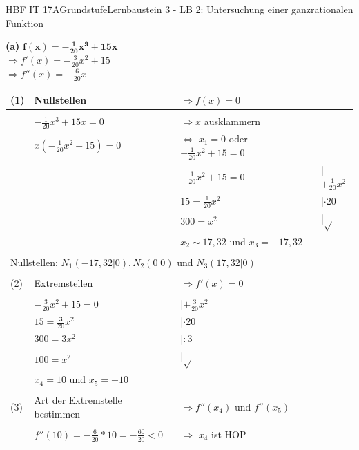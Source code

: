 \documentclass[oneside,openany,headings=optiontotoc,11pt,numbers=noenddot]{scrreprt}
\begin{document}
\begin{worksheet}{HBF IT 17A}{Grundstufe}{Lernbaustein 3 - LB 2: Untersuchung einer ganzrationalen Funktion}
		\newpage
		\begin{framed}
			\noindent
			\textbf{(a)} \(\mathbf{f(x) = -\frac{1}{20}x^3 +15x}\)\\
			\(\Rightarrow f'(x) = -\frac{3}{20}x^2 +15\)\\
			\(\Rightarrow f''(x) = -\frac{6}{20}x\)\\
			\par\bigskip\noindent
			\begin{tabularx}{\textwidth}{lXXl}
				(1) & Nullstellen & \(\Rightarrow f(x) = 0\)\\
				 \hline\\
				 & \(-\frac{1}{20}x^3 +15x = 0\) & \(\Rightarrow x\) ausklammern\\
				 & \( x(-\frac{1}{20}x^2 +15) = 0\) & \(\Leftrightarrow\) \colorbox{green!10}{\(x_1 = 0\)} oder \(-\frac{1}{20}x^2 +15 = 0\)\\
				 & & \(-\frac{1}{20}x^2 +15 = 0\) & |\(+\frac{1}{20}x^2\)\\
				 & & \(15 = \frac{1}{20}x^2\) & |\(\cdot20\)\\
				 & & \(300 = x^2\) & |\(\sqrt{}\)\\
				 & & \colorbox{green!10}{\(x_2 \sim 17,32\)} und \colorbox{green!10}{\(x_3 = -17,32\)}\\
				 \\
				 \multicolumn{4}{l}{Nullstellen: \colorbox{blue!5}{\(N_1(-17,32|0), N_2(0|0)\)} und \colorbox{blue!5}{\(N_3(17,32|0)\)}}\\
				 \hline\hline\\
				 (2) & Extremstellen & \(\Rightarrow f'(x) = 0\)\\
				 \hline\\
				 & \(-\frac{3}{20}x^2 +15 = 0\) & |\(+ \frac{3}{20}x^2\)\\
				 & \(15 = \frac{3}{20}x^2\) & |\(\cdot20\)\\
				 & \(300 = 3x^2\) & |\(:3\)\\
				 & \(100 = x^2\) & |\(\sqrt{}\)\\
				 & \colorbox{green!10}{\(x_4 = 10\)} und \colorbox{green!10}{\(x_5 = -10\)}\\
				 \\
				 (3) & Art der Extremstelle bestimmen & \(\Rightarrow f''(x_4)\) und \(f''(x_5)\)\\
				 \hline\\				 
				 & \(f''(10) = -\frac{6}{20}*10 = -\frac{60}{20} < 0\) & \(\Rightarrow\) \colorbox{green!10}{\(x_4\) ist HOP}\\

\end{tabularx}
\end{framed}
\end{worksheet}
\end{document}
